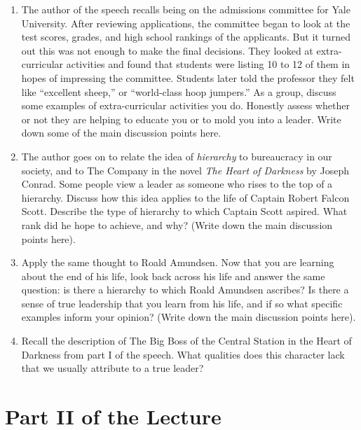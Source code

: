 \documentclass{article}
\begin{document}
\begin{enumerate}
\item The author of the speech recalls being on the admissions committee for Yale University.  After reviewing applications, the committee began to look at the test scores, grades, and high school rankings of the applicants.  But it turned out this was not enough to make the final decisions.  They looked at extra-curricular activities and found that students were listing 10 to 12 of them in hopes of impressing the committee.  Students later told the professor they felt like ``excellent sheep,'' or ``world-class hoop jumpers.''  As a group, discuss some examples of extra-curricular activities you do.  Honestly assess whether or not they are helping to educate you or to mold you into a leader. Write down some of the main discussion points here.  \\ \vspace{4cm}
\item The author goes on to relate the idea of \textit{hierarchy} to bureaucracy in our society, and to The Company in the novel \textit{The Heart of Darkness} by Joseph Conrad.  Some people view a leader as someone who rises to the top of a hierarchy.  Discuss how this idea applies to the life of Captain Robert Falcon Scott.  Describe the type of hierarchy to which Captain Scott aspired.  What rank did he hope to achieve, and why?  (Write down the main discussion points here).  \\ \vspace{4cm}
\item Apply the same thought to Roald Amundsen.  Now that you are learning about the end of his life, look back across his life and answer the same question: is there a hierarchy to which Roald Amundsen ascribes?  Is there a sense of true leadership that you learn from his life, and if so what specific examples inform your opinion?  (Write down the main discussion points here). \\ \vspace{4cm}
\item Recall the description of The Big Boss of the Central Station in the Heart of Darkness from part I of the speech.  What qualities does this character lack that we usually attribute to a true leader? \\ \vspace{4cm}
\end{enumerate}

\section{Part II of the Lecture}
\end{document}
